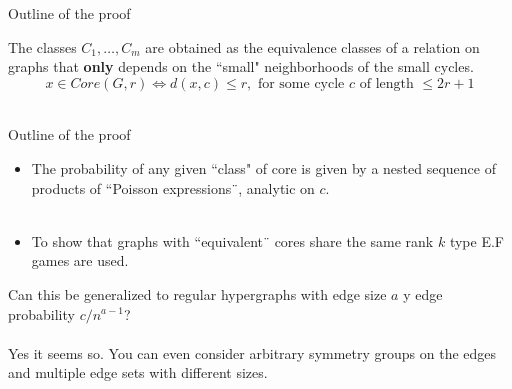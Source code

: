 \documentclass[handout, 11pt]{beamer}
\begin{document}
\begin{frame}{Outline of the proof}

The classes $C_1,\dots, C_m$ are obtained as the equivalence classes
of a relation on graphs that \textbf{only} depends on the ``small" neighborhoods
of the small cycles. \\
\[ x \in  Core(G,r) \iff d(x,c)\leq r , \text{ for some cycle }c \text{ of length 
} \leq 2r+1 \]
~\\


\end{frame}


\begin{frame}{Outline of the proof}
\Large
	\begin{itemize}
		\item The probability of any given ``class" of core is given by
		a nested sequence of products of ``Poisson expressions¨, analytic on $c$.
		\\~\\
		\item To show that graphs with ``equivalent¨ cores share the same 
		rank $k$ type E.F games are used. 
	\end{itemize}
	 
\end{frame}

\begin{frame}
	 \Large
	Can this be generalized to regular hypergraphs with edge size $a$ y
	edge probability $c/n^{a-1}$?\\~\\
	
	Yes it seems so. You can even consider arbitrary symmetry groups on the edges and
	multiple edge sets with different sizes.  
\end{frame}
\end{document}
